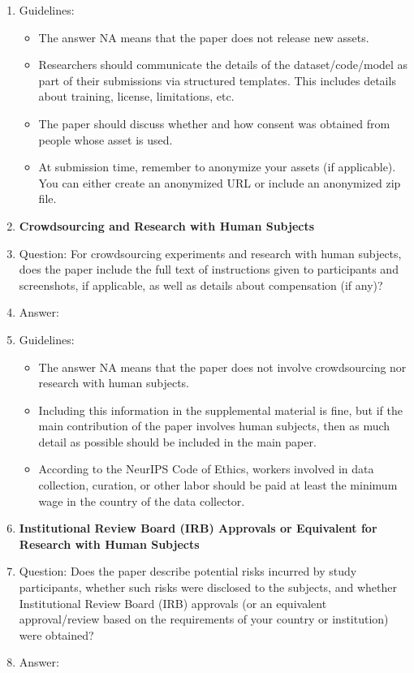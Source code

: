 \documentclass{article}
\theoremstyle{plain}
\theoremstyle{definition}
\theoremstyle{remark}
\begin{document}
\begin{enumerate}
    \item[] Guidelines:
    \begin{itemize}
        \item The answer NA means that the paper does not release new assets.
        \item Researchers should communicate the details of the dataset/code/model as part of their submissions via structured templates. This includes details about training, license, limitations, etc. 
        \item The paper should discuss whether and how consent was obtained from people whose asset is used.
        \item At submission time, remember to anonymize your assets (if applicable). You can either create an anonymized URL or include an anonymized zip file.
    \end{itemize}

\item {\bf Crowdsourcing and Research with Human Subjects}
    \item[] Question: For crowdsourcing experiments and research with human subjects, does the paper include the full text of instructions given to participants and screenshots, if applicable, as well as details about compensation (if any)? 
    \item[] Answer: \answerNA{} %
    \item[] Guidelines:
    \begin{itemize}
        \item The answer NA means that the paper does not involve crowdsourcing nor research with human subjects.
        \item Including this information in the supplemental material is fine, but if the main contribution of the paper involves human subjects, then as much detail as possible should be included in the main paper. 
        \item According to the NeurIPS Code of Ethics, workers involved in data collection, curation, or other labor should be paid at least the minimum wage in the country of the data collector. 
    \end{itemize}

\item {\bf Institutional Review Board (IRB) Approvals or Equivalent for Research with Human Subjects}
    \item[] Question: Does the paper describe potential risks incurred by study participants, whether such risks were disclosed to the subjects, and whether Institutional Review Board (IRB) approvals (or an equivalent approval/review based on the requirements of your country or institution) were obtained?
    \item[] Answer: \answerNA{} %


\end{enumerate}
\end{document}
